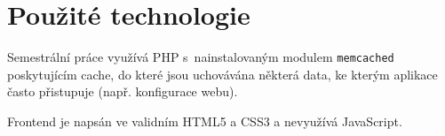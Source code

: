 \section{Použité technologie}

Semestrální práce využívá PHP s~nainstalovaným modulem \verb|memcached|
poskytujícím cache, do které jsou uchovávána některá data, ke kterým aplikace
často přistupuje (např. konfigurace webu).

Frontend je napsán ve validním HTML5 a CSS3 a nevyužívá JavaScript.
